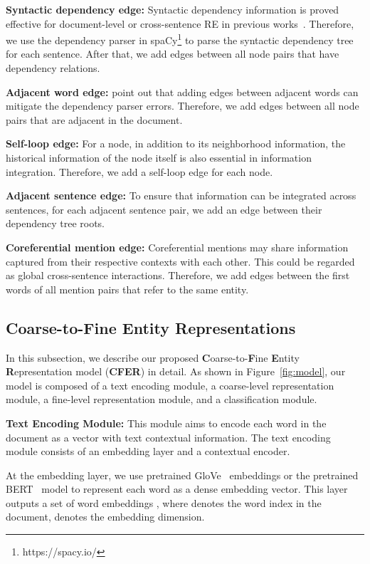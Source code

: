 \documentclass[letterpaper]{article} \usepackage{aaai21}  \usepackage{times}  \usepackage{helvet} \usepackage{courier}  \usepackage[hyphens]{url}  \usepackage{graphicx} \urlstyle{rm} \def\UrlFont{\rm}  \usepackage{natbib}  \usepackage{caption} \frenchspacing  \setlength{\pdfpagewidth}{8.5in}  \setlength{\pdfpageheight}{11in}
\begin{document}
\noindent\textbf{Syntactic dependency edge:}
Syntactic dependency information is proved effective for document-level or cross-sentence RE in previous works~\citep{gcnn,idepnn,graph_lstm,gs_lstm}. 
Therefore, we use the dependency parser in spaCy\footnote{https://spacy.io/} to parse the syntactic dependency tree for each sentence. 
After that, we add edges between all node pairs that have dependency relations. 

\noindent\textbf{Adjacent word edge:}
\citet{quirk_and_poon} point out that adding edges between adjacent words can mitigate the dependency parser errors.
Therefore, we add edges between all node pairs that are adjacent in the document. 

\noindent\textbf{Self-loop edge:}
For a node, in addition to its neighborhood information, the historical information of the node itself is also essential in information integration. 
Therefore, we add a self-loop edge for each node. 

\noindent\textbf{Adjacent sentence edge:}
To ensure that information can be integrated across sentences, for each adjacent sentence pair, we add an edge between their dependency tree roots. 

\noindent\textbf{Coreferential mention edge:}
Coreferential mentions may share information captured from their respective contexts with each other. 
This could be regarded as global cross-sentence interactions. 
Therefore, we add edges between the first words of all mention pairs that refer to the same entity. 

\subsection{Coarse-to-Fine Entity Representations}

In this subsection, we describe our proposed \textbf{C}oarse-to-\textbf{F}ine \textbf{E}ntity \textbf{R}epresentation model (\textbf{CFER}) in detail. 
As shown in Figure~\ref{fig:model}, our model is composed of a text encoding module, a coarse-level representation module, a fine-level representation module, and a classification module.  

\noindent\textbf{Text Encoding Module:} 
This module aims to encode each word in the document as a vector with text contextual information. 
The text encoding module consists of an embedding layer and a contextual encoder. 

At the embedding layer, we use pretrained GloVe~\citep{glove} embeddings or the pretrained BERT~\citep{bert} model to represent each word as a dense embedding vector. 
This layer outputs a set of word embeddings , where  denotes the word index in the document,  denotes the embedding dimension. 
\end{document}
